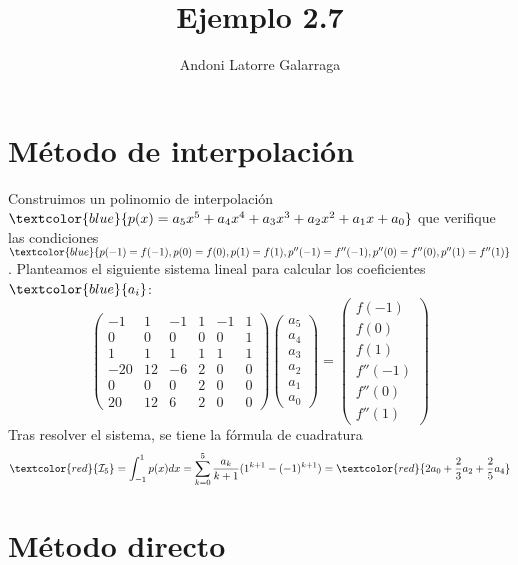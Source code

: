 \documentclass{article}
\title{Ejemplo 2.7}
\author{Andoni Latorre Galarraga}
\date{}
\begin{document}
\maketitle

\section{Método de interpolación}

Construimos un polinomio de interpolación $\textcolor{blue}{p(x)= a_5 x^5 + a_4 x^4 + a_3 x^3 + a_2 x^2 + a_1 x + a_0}$ que verifique las condiciones $\textcolor{blue}{p(-1)=f(-1), p(0)=f(0), p(1)=f(1), p''(-1)=f''(-1), p''(0)=f''(0), p''(1)=f''(1)}$. Planteamos el siguiente sistema lineal para calcular los coeficientes $\textcolor{blue}{a_i}$:
$$
\left(\begin{array}{cccccc}
     -1 &  1 & -1 & 1 & -1 & 1 \\
      0 &  0 &  0 & 0 &  0 & 1 \\
      1 &  1 &  1 & 1 &  1 & 1 \\
    -20 & 12 & -6 & 2 &  0 & 0 \\
      0 &  0 &  0 & 2 &  0 & 0 \\
     20 & 12 &  6 & 2 &  0 & 0
\end{array}\right)
\left(\begin{array}{c}
    a_5 \\
    a_4 \\
    a_3 \\
    a_2 \\
    a_1 \\
    a_0
\end{array}\right)
=
\left(\begin{array}{c}
    f(-1) \\
    f(0) \\
    f(1) \\
    f''(-1) \\
    f''(0) \\
    f''(1)
\end{array}\right) 
$$
Tras resolver el sistema, se tiene la fórmula de cuadratura
$$
\textcolor{red}{\mathcal{I}_5}= \int_{-1}^1 p(x) dx = \sum_{k=0}^5 \frac{a_k}{k+1} (1^{k+1}-(-1)^{k+1}) = \textcolor{red}{2 a_0 + \frac{2}{3} a_2 + \frac{2}{5} a_4}
$$

\section{Método directo}
\end{document}
